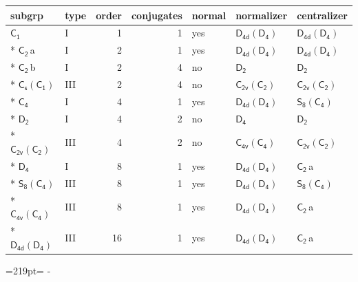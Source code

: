 \documentclass[10pt,a4paper]{article}
\newcommand{\needspace}[1]{\par\penalty-100\begingroup\dimen0=#1\relax\dimen2=\pagegoal
  \advance\dimen2-\pagetotal\ifdim\dimen0>\dimen2\relax\ifdim\dimen2>0pt\vfil\break\fi\fi
  \endgroup}
\numberwithin{equation}{section}
\newcommand{\grp}[1]{\mathsf{#1}}
\newcommand{\clsletter}[1]{\,{\scriptsize\color{black!55}#1}}
\begin{document}
{\small\begin{longtable}{@{}llrrlll@{}}\toprule
subgrp & type & order & conjugates & normal & normalizer & centralizer\\\midrule\endhead
\bottomrule\endfoot\endlastfoot
\href{../../../rotation/data/pdf/C1.pdf}{$\grp{C_{1}}$} & I & 1 & 1 & yes & \href{D4d-D4.pdf}{$\grp{D_{4d}}(\grp{D_{4}})$} & \href{D4d-D4.pdf}{$\grp{D_{4d}}(\grp{D_{4}})$}\\*
\href{../../../rotation/data/pdf/C2.pdf}{$\grp{C_{2}}$}\clsletter{a} & I & 2 & 1 & yes & \href{D4d-D4.pdf}{$\grp{D_{4d}}(\grp{D_{4}})$} & \href{D4d-D4.pdf}{$\grp{D_{4d}}(\grp{D_{4}})$}\\*
\href{../../../rotation/data/pdf/C2.pdf}{$\grp{C_{2}}$}\clsletter{b} & I & 2 & 4 & no & \href{../../../rotation/data/pdf/D2.pdf}{$\grp{D_{2}}$} & \href{../../../rotation/data/pdf/D2.pdf}{$\grp{D_{2}}$}\\*
\href{C1v-C1.pdf}{$\grp{C_{s}}(\grp{C_{1}})$} & III & 2 & 4 & no & \href{C2v-C2.pdf}{$\grp{C_{2v}}(\grp{C_{2}})$} & \href{C2v-C2.pdf}{$\grp{C_{2v}}(\grp{C_{2}})$}\\*
\href{../../../rotation/data/pdf/C4.pdf}{$\grp{C_{4}}$} & I & 4 & 1 & yes & \href{D4d-D4.pdf}{$\grp{D_{4d}}(\grp{D_{4}})$} & \href{S8-C4.pdf}{$\grp{S_{8}}(\grp{C_{4}})$}\\*
\href{../../../rotation/data/pdf/D2.pdf}{$\grp{D_{2}}$} & I & 4 & 2 & no & \href{../../../rotation/data/pdf/D4.pdf}{$\grp{D_{4}}$} & \href{../../../rotation/data/pdf/D2.pdf}{$\grp{D_{2}}$}\\*
\href{C2v-C2.pdf}{$\grp{C_{2v}}(\grp{C_{2}})$} & III & 4 & 2 & no & \href{C4v-C4.pdf}{$\grp{C_{4v}}(\grp{C_{4}})$} & \href{C2v-C2.pdf}{$\grp{C_{2v}}(\grp{C_{2}})$}\\*
\href{../../../rotation/data/pdf/D4.pdf}{$\grp{D_{4}}$} & I & 8 & 1 & yes & \href{D4d-D4.pdf}{$\grp{D_{4d}}(\grp{D_{4}})$} & \href{../../../rotation/data/pdf/C2.pdf}{$\grp{C_{2}}$}\clsletter{a}\\*
\href{S8-C4.pdf}{$\grp{S_{8}}(\grp{C_{4}})$} & III & 8 & 1 & yes & \href{D4d-D4.pdf}{$\grp{D_{4d}}(\grp{D_{4}})$} & \href{S8-C4.pdf}{$\grp{S_{8}}(\grp{C_{4}})$}\\*
\href{C4v-C4.pdf}{$\grp{C_{4v}}(\grp{C_{4}})$} & III & 8 & 1 & yes & \href{D4d-D4.pdf}{$\grp{D_{4d}}(\grp{D_{4}})$} & \href{../../../rotation/data/pdf/C2.pdf}{$\grp{C_{2}}$}\clsletter{a}\\*
\href{D4d-D4.pdf}{$\grp{D_{4d}}(\grp{D_{4}})$} & III & 16 & 1 & yes & \href{D4d-D4.pdf}{$\grp{D_{4d}}(\grp{D_{4}})$} & \href{../../../rotation/data/pdf/C2.pdf}{$\grp{C_{2}}$}\clsletter{a}\\
\bottomrule\end{longtable}}
\needspace{219pt}
\end{document}

